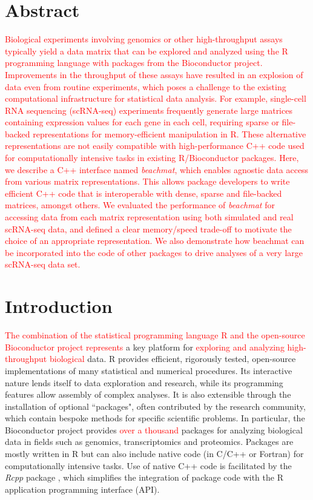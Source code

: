 \documentclass[10pt,letterpaper]{article}
\newcommand{\beachmat}{\textit{beachmat}}
\newcommand{\revised}[1]{\textcolor{red}{#1}}
\begin{document}
\section*{Abstract}
\revised{Biological experiments involving genomics or other high-throughput assays typically yield a data matrix that can be explored and analyzed using the R programming language with packages from the Bioconductor project.
Improvements in the throughput of these assays have resulted in an explosion of data even from routine experiments, which poses a challenge to the existing computational infrastructure for statistical data analysis.
For example, single-cell RNA sequencing (scRNA-seq) experiments frequently generate large matrices containing expression values for each gene in each cell, requiring sparse or file-backed representations for memory-efficient manipulation in R.
These alternative representations are not easily compatible with high-performance C++ code used for computationally intensive tasks in existing R/Bioconductor packages.
Here, we describe a C++ interface named \beachmat{}, which enables agnostic data access from various matrix representations.
This allows package developers to write efficient C++ code that is interoperable with dense, sparse and file-backed matrices, amongst others.
We evaluated the performance of \beachmat{} for accessing data from each matrix representation using both simulated and real scRNA-seq data, and defined a clear memory/speed trade-off to motivate the choice of an appropriate representation.
We also demonstrate how beachmat can be incorporated into the code of other packages to drive analyses of a very large scRNA-seq data set.}

\linenumbers

\section*{Introduction}
\revised{The combination of the statistical programming language R \cite{R} and the open-source Bioconductor project \cite{gentleman2004bioconductor} represents} a key platform for \revised{exploring and analyzing high-throughput biological} data.
R provides efficient, rigorously tested, open-source implementations of many statistical and numerical procedures.
Its interactive nature lends itself to data exploration and research, while its programming features allow assembly of complex analyses.
It is also extensible through the installation of optional ``packages", often contributed by the research community, which contain bespoke methods for specific scientific problems.
In particular, the Bioconductor project \cite{huber2015orchestrating} provides \revised{over a thousand} packages for analyzing biological data in fields such as genomics, transcriptomics and proteomics.
Packages are mostly written in R but can also include native code (in C/C++ or Fortran) for computationally intensive tasks.
Use of native C++ code is facilitated by the \textit{Rcpp} package \cite{eddelbuettel2011seamless}, which simplifies the integration of package code with the R application programming interface (API).
\end{document}
